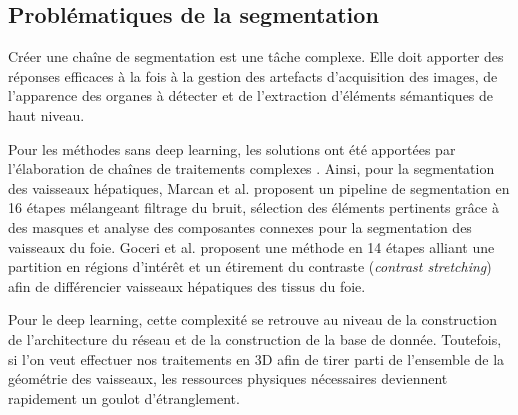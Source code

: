     \subsection{Problématiques de la segmentation}
    \label{sec:problems_segmenation}
    Créer une chaîne de segmentation est une tâche complexe. Elle doit apporter des réponses efficaces à la fois à la gestion des artefacts d'acquisition des images, de l'apparence des organes à détecter et de l'extraction d'éléments sémantiques de haut niveau. 

    Pour les méthodes sans deep learning, les solutions ont été apportées par l'élaboration de chaînes de traitements complexes . Ainsi, pour la segmentation des vaisseaux hépatiques, Marcan et al. \cite{Marcan2014_vessel_seg} proposent un pipeline de segmentation en 16 étapes mélangeant filtrage du bruit, sélection des éléments pertinents grâce à des masques et analyse des composantes connexes pour la segmentation des vaisseaux du foie. Goceri et al. \cite{Goceri2017_vessel} proposent une méthode en 14 étapes alliant une partition en régions d'intérêt et un étirement du contraste (\textit{contrast stretching}) afin de différencier vaisseaux hépatiques des tissus du foie.
  
    Pour le deep learning, cette complexité se retrouve au niveau de la construction de l'architecture du réseau et de la construction de la base de donnée. Toutefois, si l'on veut effectuer nos traitements en 3D afin de tirer parti de l'ensemble de la géométrie des vaisseaux, les ressources physiques nécessaires deviennent rapidement un goulot d'étranglement.  
    
